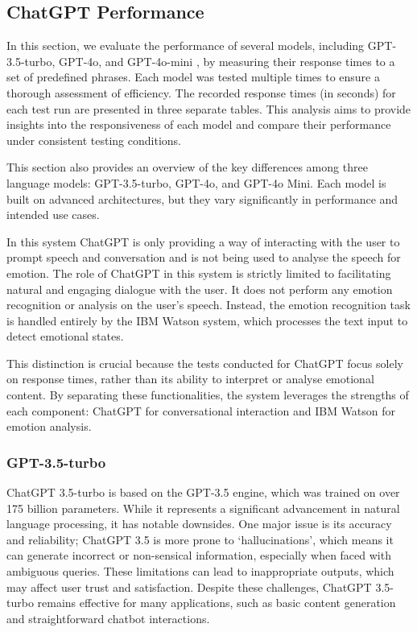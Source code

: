\subsection{ChatGPT Performance}

In this section, we evaluate the performance of several models, including GPT-3.5-turbo, GPT-4o, and GPT-4o-mini \cite{openai2024}, by measuring their response times to a set of predefined phrases. Each model was tested multiple times to ensure a thorough assessment of efficiency. The recorded response times (in seconds) for each test run are presented in three separate tables. This analysis aims to provide insights into the responsiveness of each model and compare their performance under consistent testing conditions.

This section also provides an overview of the key differences among three language models: GPT-3.5-turbo, GPT-4o, and GPT-4o Mini. Each model is built on advanced architectures, but they vary significantly in performance and intended use cases.

In this system ChatGPT is only providing a way of interacting with the user to prompt speech and conversation and is not being used to analyse the speech for emotion. The role of ChatGPT in this system is strictly limited to facilitating natural and engaging dialogue with the user. It does not perform any emotion recognition or analysis on the user's speech. Instead, the emotion recognition task is handled entirely by the IBM Watson system, which processes the text input to detect emotional states.

This distinction is crucial because the tests conducted for ChatGPT focus solely on response times, rather than its ability to interpret or analyse emotional content. By separating these functionalities, the system leverages the strengths of each component: ChatGPT for conversational interaction and IBM Watson for emotion analysis.

\subsubsection{GPT-3.5-turbo}

ChatGPT 3.5-turbo is based on the GPT-3.5 engine, which was trained on over 175 billion parameters. While it represents a significant advancement in natural language processing, it has notable downsides. One major issue is its accuracy and reliability; ChatGPT 3.5 is more prone to `hallucinations', which means it can generate incorrect or non-sensical information, especially when faced with ambiguous queries. These limitations can lead to inappropriate outputs, which may affect user trust and satisfaction. Despite these challenges, ChatGPT 3.5-turbo remains effective for many applications, such as basic content generation and straightforward chatbot interactions.

